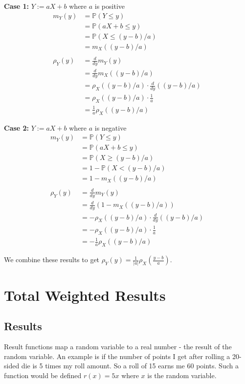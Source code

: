 \documentclass{article}
\begin{document}
	\begin{minipage}{0.48\textwidth}
		\textbf{Case 1:} $Y := aX + b$ where $a$ is positive
		\begin{align*}
			m_Y(y) &= \mathbb{P}(Y \leq y) \\
			&= \mathbb{P}(aX + b \leq y) \\
			&= \mathbb{P}(X \leq (y-b)/a) \\
			&= m_X((y-b)/a) \\
			\\
			\rho_Y(y) &= \frac{d}{dy}m_Y(y) \\
			&= \frac{d}{dy}m_X((y-b)/a) \\
			&= \rho_X((y-b)/a) \cdot \frac{d}{dy}((y-b)/a) \\
			&= \rho_X((y-b)/a) \cdot \frac{1}{a} \\
			&= \frac{1}{a}\rho_X((y-b)/a)
		\end{align*}
	\end{minipage}
	\hfill
	\begin{minipage}{0.48\textwidth}
		\textbf{Case 2:} $Y := aX + b$ where $a$ is negative
		\begin{align*}
			m_Y(y) &= \mathbb{P}(Y \leq y) \\
			&= \mathbb{P}(aX + b \leq y) \\
			&= \mathbb{P}(X \geq (y-b)/a) \\
			&= 1 - \mathbb{P}(X < (y-b)/a) \\
			&= 1 - m_X((y-b)/a) \\
			\\
			\rho_Y(y) &= \frac{d}{dy}m_Y(y) \\
			&= \frac{d}{dy}(1 - m_X((y-b)/a)) \\
			&= -\rho_X((y-b)/a) \cdot \frac{d}{dy}((y-b)/a) \\
			&= -\rho_X((y-b)/a) \cdot \frac{1}{a} \\
			&= -\frac{1}{a}\rho_X((y-b)/a)
		\end{align*}
	\end{minipage}
	
	We combine these results to get $\rho_Y(y) = \frac{1}{|a|}\rho_X(\frac{y-b}{a})$.

	\section{Total Weighted Results}
		
		\subsection{Results}
			Result functions map a random variable to a real number - the result of the random variable.
			An example is if the number of points I get after rolling a 20-sided die is 5 times my roll amount.
			So a roll of 15 earns me 60 points. Such a function would be defined $r(x)=5x$ where $x$ is the random variable.
	
\end{document}
